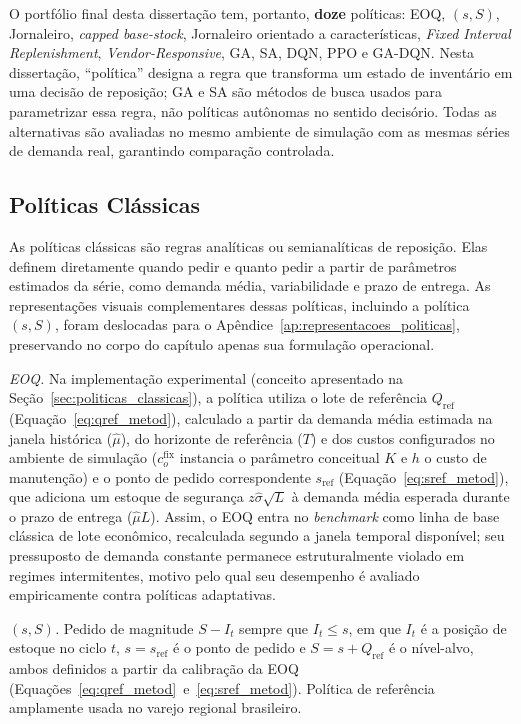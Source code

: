 O portfólio final desta dissertação tem, portanto, \textbf{doze} políticas: EOQ, $(s,S)$, Jornaleiro, \textit{capped base-stock}, Jornaleiro orientado a características, \textit{Fixed Interval Replenishment}, \textit{Vendor-Responsive}, GA, SA, DQN, PPO e GA-DQN. Nesta dissertação, ``política'' designa a regra que transforma um estado de inventário em uma decisão de reposição; GA e SA são métodos de busca usados para parametrizar essa regra, não políticas autônomas no sentido decisório. Todas as alternativas são avaliadas no mesmo ambiente de simulação com as mesmas séries de demanda real, garantindo comparação controlada.

\subsection{Políticas Clássicas}

As políticas clássicas são regras analíticas ou semianalíticas de reposição. Elas definem diretamente quando pedir e quanto pedir a partir de parâmetros estimados da série, como demanda média, variabilidade e prazo de entrega. As representações visuais complementares dessas políticas, incluindo a política $(s,S)$, foram deslocadas para o Apêndice~\ref{ap:representacoes_politicas}, preservando no corpo do capítulo apenas sua formulação operacional.

\textit{EOQ.} Na implementação experimental (conceito apresentado na Seção~\ref{sec:politicas_classicas}), a política utiliza o lote de referência $Q_{\text{ref}}$ (Equação~\ref{eq:qref_metod}), calculado a partir da demanda média estimada na janela histórica ($\hat{\mu}$), do horizonte de referência ($T$) e dos custos configurados no ambiente de simulação ($c_o^{\text{fix}}$ instancia o parâmetro conceitual $K$ e $h$ o custo de manutenção) e o ponto de pedido correspondente $s_{\text{ref}}$ (Equação~\ref{eq:sref_metod}), que adiciona um estoque de segurança $z\hat{\sigma}\sqrt{L}$ à demanda média esperada durante o prazo de entrega ($\hat{\mu}L$). Assim, o EOQ entra no \textit{benchmark} como linha de base clássica de lote econômico, recalculada segundo a janela temporal disponível; seu pressuposto de demanda constante permanece estruturalmente violado em regimes intermitentes, motivo pelo qual seu desempenho é avaliado empiricamente contra políticas adaptativas.

\textit{$(s,S)$.} Pedido de magnitude $S - I_t$ sempre que $I_t \leq s$, em que $I_t$ é a posição de estoque no ciclo $t$, $s = s_{\text{ref}}$ é o ponto de pedido e $S = s + Q_{\text{ref}}$ é o nível-alvo, ambos definidos a partir da calibração da EOQ (Equações~\ref{eq:qref_metod}~e~\ref{eq:sref_metod}). Política de referência amplamente usada no varejo regional brasileiro.

